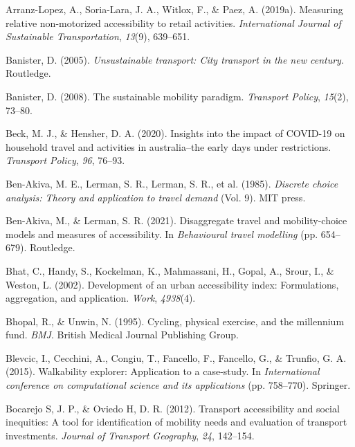 \documentclass[
11pt, %
oneside, %
english, %
singlespacing, %
]{macthesis} %
\newlength{\cslhangindent}
\newenvironment{CSLReferences}[2] %
{\begin{list}{}{%
	\setlength{\itemindent}{0pt}
	\setlength{\leftmargin}{0pt}
	\setlength{\parsep}{0pt}
	\ifodd #1
	\setlength{\leftmargin}{\cslhangindent}
	\setlength{\itemindent}{-1\cslhangindent}
	\fi
	\setlength{\itemsep}{#2\baselineskip}}}
{\end{list}}
\begin{document}
\begin{CSLReferences}{1}{0}
Arranz-Lopez, A., Soria-Lara, J. A., Witlox, F., \& Paez, A. (2019a). Measuring relative non-motorized accessibility to retail activities. \emph{International Journal of Sustainable Transportation}, \emph{13}(9), 639--651.

Banister, D. (2005). \emph{Unsustainable transport: City transport in the new century}. Routledge.

Banister, D. (2008). The sustainable mobility paradigm. \emph{Transport Policy}, \emph{15}(2), 73--80.

Beck, M. J., \& Hensher, D. A. (2020). Insights into the impact of COVID-19 on household travel and activities in australia--the early days under restrictions. \emph{Transport Policy}, \emph{96}, 76--93.

Ben-Akiva, M. E., Lerman, S. R., Lerman, S. R., et al. (1985). \emph{Discrete choice analysis: Theory and application to travel demand} (Vol. 9). MIT press.

Ben-Akiva, M., \& Lerman, S. R. (2021). Disaggregate travel and mobility-choice models and measures of accessibility. In \emph{Behavioural travel modelling} (pp. 654--679). Routledge.

Bhat, C., Handy, S., Kockelman, K., Mahmassani, H., Gopal, A., Srour, I., \& Weston, L. (2002). Development of an urban accessibility index: Formulations, aggregation, and application. \emph{Work}, \emph{4938}(4).

Bhopal, R., \& Unwin, N. (1995). Cycling, physical exercise, and the millennium fund. \emph{BMJ}. British Medical Journal Publishing Group.

Blevcic, I., Cecchini, A., Congiu, T., Fancello, F., Fancello, G., \& Trunfio, G. A. (2015). Walkability explorer: Application to a case-study. In \emph{International conference on computational science and its applications} (pp. 758--770). Springer.

Bocarejo S, J. P., \& Oviedo H, D. R. (2012). Transport accessibility and social inequities: A tool for identification of mobility needs and evaluation of transport investments. \emph{Journal of Transport Geography}, \emph{24}, 142--154.


\end{CSLReferences}
\end{document}
